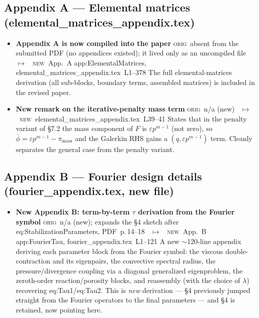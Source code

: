 \documentclass[11pt]{article}
\newcommand{\Orig}{\textcolor{origc}{\footnotesize\textsc{orig}}}
\newcommand{\New}{\textcolor{newc}{\footnotesize\textsc{new}}}
\newcommand{\code}[1]{\textcolor{newc}{\ttfamily\small #1}}
\newcommand{\pdfp}[1]{PDF~p.\,#1}
\newcommand{\appl}[2]{#1~L#2}          %
\newcommand{\ch}[4]{%
  \item \textbf{#1}\newline
    {\footnotesize\Orig\ #2 \ \textcolor{locc}{$\longmapsto$} \ \New\ #3}\newline
    #4}
\begin{document}
\subsection{Appendix A --- Elemental matrices (\code{elemental\_matrices\_appendix.tex})}
\begin{itemize}
\ch{Appendix A is now compiled into the paper}
   {absent from the submitted PDF (no appendices existed); it lived only as an uncompiled file}
   {App.~A \code{app:ElementalMatrices}, \appl{elemental\_matrices\_appendix.tex}{1}--378}
   {The full elemental-matrices derivation (all sub-blocks, boundary terms, assembled matrices)
    is included in the revised paper.}
\ch{New remark on the iterative-penalty mass term}
   {n/a (new)}
   {\appl{elemental\_matrices\_appendix.tex}{39}--41}
   {States that in the penalty variant of \S7.2 the mass component of $F$ is $\varepsilon p^{m-1}$
    (not zero), so $\overline\phi=\varepsilon p^{m-1}-\pi_{\mathrm{mass}}$ and the Galerkin RHS gains a
    $(q,\varepsilon p^{m-1})$ term. Cleanly separates the general case from the penalty variant.}
\end{itemize}

\subsection{Appendix B --- Fourier design details (\code{fourier\_appendix.tex}, new file)}
\begin{itemize}
\ch{New Appendix B: term-by-term $\tau$ derivation from the Fourier symbol}
   {n/a (new); expands the \S4 sketch after \code{eq:StabilizationParameters}, \pdfp{14}--18}
   {App.~B \code{app:FourierTau}, \appl{fourier\_appendix.tex}{1}--121}
   {A new $\sim$120-line appendix deriving each parameter block from the Fourier symbol: the viscous
    double-contraction and its eigenpairs, the convective spectral radius, the pressure/divergence
    coupling via a diagonal generalized eigenproblem, the zeroth-order reaction/porosity blocks, and
    reassembly (with the choice of $\lambda$) recovering \code{eq:Tau1}/\code{eq:Tau2}. This is
    \emph{new} derivation --- \S4 previously jumped straight from the Fourier operators to the final
    parameters --- and \S4 is retained, now pointing here.}
\end{itemize}
\end{document}
